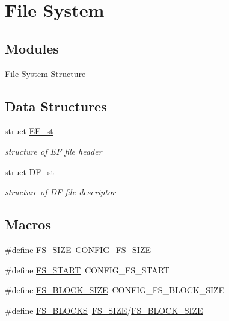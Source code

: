 \hypertarget{group__fs}{\section{File System}
\label{group__fs}
}
\subsection*{Modules}
\begin{DoxyCompactItemize}
\item 
\hyperlink{group__fs__structure}{File System Structure}
\end{DoxyCompactItemize}
\subsection*{Data Structures}
\begin{DoxyCompactItemize}
\item 
struct \hyperlink{structEF__st}{E\-F\-\_\-st}
\begin{DoxyCompactList}\small\item\em structure of E\-F file header \end{DoxyCompactList}\item 
struct \hyperlink{structDF__st}{D\-F\-\_\-st}
\begin{DoxyCompactList}\small\item\em structure of D\-F file descriptor \end{DoxyCompactList}\end{DoxyCompactItemize}
\subsection*{Macros}
\begin{DoxyCompactItemize}
\item 
\#define \hyperlink{group__fs_ga3167e1c51bc79684fdfb78c181075d11}{F\-S\-\_\-\-S\-I\-Z\-E}~C\-O\-N\-F\-I\-G\-\_\-\-F\-S\-\_\-\-S\-I\-Z\-E
\item 
\#define \hyperlink{group__fs_ga484d3b027c362670c91431b360d8e41a}{F\-S\-\_\-\-S\-T\-A\-R\-T}~C\-O\-N\-F\-I\-G\-\_\-\-F\-S\-\_\-\-S\-T\-A\-R\-T
\item 
\#define \hyperlink{group__fs_gad6b56bdbbe5838a6260ddc0926fa1891}{F\-S\-\_\-\-B\-L\-O\-C\-K\-\_\-\-S\-I\-Z\-E}~C\-O\-N\-F\-I\-G\-\_\-\-F\-S\-\_\-\-B\-L\-O\-C\-K\-\_\-\-S\-I\-Z\-E
\item 
\#define \hyperlink{group__fs_ga5534402cd21abf73c1851e468ca502c4}{F\-S\-\_\-\-B\-L\-O\-C\-K\-S}~\hyperlink{group__fs_ga3167e1c51bc79684fdfb78c181075d11}{F\-S\-\_\-\-S\-I\-Z\-E}/\hyperlink{group__fs_gad6b56bdbbe5838a6260ddc0926fa1891}{F\-S\-\_\-\-B\-L\-O\-C\-K\-\_\-\-S\-I\-Z\-E}
\end{DoxyCompactItemize}
